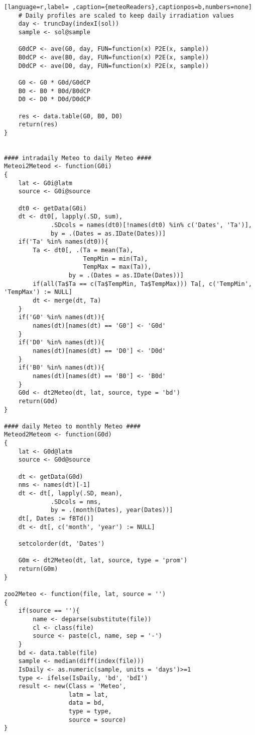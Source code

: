 \begin{lstlisting}[language=r,label= ,caption={meteoReaders},captionpos=b,numbers=none]
    # Daily profiles are scaled to keep daily irradiation values
    day <- truncDay(indexI(sol))
    sample <- sol@sample

    G0dCP <- ave(G0, day, FUN=function(x) P2E(x, sample))
    B0dCP <- ave(B0, day, FUN=function(x) P2E(x, sample))
    D0dCP <- ave(D0, day, FUN=function(x) P2E(x, sample))

    G0 <- G0 * G0d/G0dCP
    B0 <- B0 * B0d/B0dCP
    D0 <- D0 * D0d/D0dCP

    res <- data.table(G0, B0, D0)
    return(res)
}


#### intradaily Meteo to daily Meteo ####
Meteoi2Meteod <- function(G0i)
{
    lat <- G0i@latm
    source <- G0i@source

    dt0 <- getData(G0i)
    dt <- dt0[, lapply(.SD, sum), 
             .SDcols = names(dt0)[!names(dt0) %in% c('Dates', 'Ta')],
             by = .(Dates = as.IDate(Dates))]
    if('Ta' %in% names(dt0)){
        Ta <- dt0[, .(Ta = mean(Ta),
                      TempMin = min(Ta),
                      TempMax = max(Ta)),
                  by = .(Dates = as.IDate(Dates))]
        if(all(Ta$Ta == c(Ta$TempMin, Ta$TempMax))) Ta[, c('TempMin', 'TempMax') := NULL]
        dt <- merge(dt, Ta)
    }
    if('G0' %in% names(dt)){
        names(dt)[names(dt) == 'G0'] <- 'G0d'
    }
    if('D0' %in% names(dt)){
        names(dt)[names(dt) == 'D0'] <- 'D0d'
    }
    if('B0' %in% names(dt)){
        names(dt)[names(dt) == 'B0'] <- 'B0d'
    }
    G0d <- dt2Meteo(dt, lat, source, type = 'bd')
    return(G0d)
}

#### daily Meteo to monthly Meteo ####
Meteod2Meteom <- function(G0d)
{
    lat <- G0d@latm
    source <- G0d@source

    dt <- getData(G0d)
    nms <- names(dt)[-1]
    dt <- dt[, lapply(.SD, mean),
             .SDcols = nms,
             by = .(month(Dates), year(Dates))]
    dt[, Dates := fBTd()]
    dt <- dt[, c('month', 'year') := NULL]

    setcolorder(dt, 'Dates')

    G0m <- dt2Meteo(dt, lat, source, type = 'prom')
    return(G0m)
}

zoo2Meteo <- function(file, lat, source = '')
{
    if(source == ''){
        name <- deparse(substitute(file))
        cl <- class(file)
        source <- paste(cl, name, sep = '-')
    }
    bd <- data.table(file)
    sample <- median(diff(index(file)))
    IsDaily <- as.numeric(sample, units = 'days')>=1
    type <- ifelse(IsDaily, 'bd', 'bdI')
    result <- new(Class = 'Meteo',
                  latm = lat,
                  data = bd,
                  type = type,
                  source = source)
}


\end{lstlisting}
